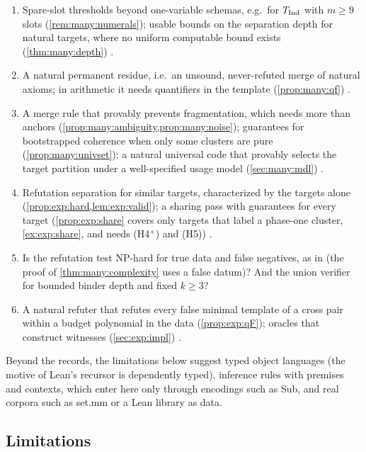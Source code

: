 \begin{enumerate}[label=O\arabic*,ref=O\arabic*,leftmargin=*,itemsep=0pt,topsep=3pt]
data when guards are also learned for term metavariables (\cref{app:zf:fofail}). Partial or inconsistent
$\alpha$-renaming of binders (\cref{prop:zf:alpha} covers full renaming) .
\item Spare-slot thresholds beyond one-variable schemas, e.g.\ for $T_{\mathrm{Ind}}$ with $m\ge9$ slots
(\cref{rem:many:numerals}); usable bounds on the separation depth for natural targets, where no uniform computable
bound exists (\cref{thm:many:depth}) .
\item A natural permanent residue, i.e.\ an unsound, never-refuted merge of natural axioms; in arithmetic it needs
quantifiers in the template (\cref{prop:many:qf}) .
\item A merge rule that provably prevents fragmentation, which needs more than anchors
(\cref{prop:many:ambiguity,prop:many:noise}); guarantees for bootstrapped coherence when only some clusters are pure
(\cref{prop:many:univset}); a natural universal code that provably selects the target partition under a well-specified
usage model (\cref{sec:many:mdl}) .
\item Refutation separation for similar targets, characterized by the targets alone
(\cref{prop:exp:hard,lem:exp:valid}); a sharing pass with guarantees for every target (\cref{prop:exp:share} covers only
targets that label a phase-one cluster, \cref{ex:exp:share}, and needs (H4$^+$) and (H5)) .
\item\label{op:disc:cost} Is the refutation test NP-hard for true data and false negatives, as in \DTRC{} (the proof of
\cref{thm:many:complexity} uses a false datum)? And the union verifier for bounded binder depth and fixed $k\ge3$?
\item A natural refuter that refutes every false minimal template of a cross pair within a budget polynomial in the
data (\cref{prop:exp:qF}); oracles that construct witnesses (\cref{sec:exp:impl}) .
\end{enumerate}
Beyond the records, the limitations below suggest typed object languages (the motive of Lean's recursor is
dependently typed), inference rules with premises and contexts, which enter here only through encodings such as Sub,
and real corpora such as set.mm or a Lean library as data.

\subsection{Limitations}\label{sec:disc:limits}

